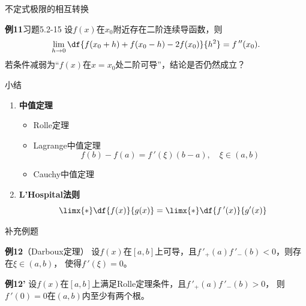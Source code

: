 \begin{frame}{不定式极限的相互转换}
	\linespread{1.2}
	\begin{center}
	\end{center}
\end{frame}

\begin{frame}
	\linespread{1.2}
	\begin{exampleblock}{{\bf 例11}\hfill 习题5.2-15}
		设$f(x)$在$x_0$附近存在二阶连续导函数，则
		$$\lim\limits_{h\to 0}\df{f(x_0+h)+f(x_0-h)-2f(x_0)}{h^2}=f\,''(x_0).$$
		若条件减弱为“$f(x)$在$x=x_0$处二阶可导”，结论是否仍然成立？
	\end{exampleblock}
\end{frame}

\begin{frame}[<+->]{小结}
	\linespread{1.5}
	\begin{enumerate}
	  \item {\bf 中值定理}
	  \begin{itemize}
	    \item Rolle定理
	    \item Lagrange中值定理
	    $$f(b)-f(a)=f\,'(\xi)(b-a),\quad \xi\in(a,b)$$
	    \item Cauchy中值定理
	  \end{itemize}
	  \item {\bf L'Hospital法则}
	  $$\limx{*}\df{f(x)}{g(x)}=\limx{*}\df{f\,'(x)}{g'(x)}$$
	\end{enumerate}
\end{frame}

\begin{frame}{补充例题}
	\linespread{1.2}
	\begin{exampleblock}{{\bf 例12}（Darboux定理）\hfill}
		设$f(x)$在$[a,b]$上可导，且$f\,'_+(a)f\,'_-(b)<0$，则存在$\xi\in(a,b)$，
		使得$f\,'(\xi)=0$。
	\end{exampleblock}
	\pause
	\bigskip
	\begin{exampleblock}{{\bf 例12'}\hfill}
		设$f(x)$在$[a,b]$上满足Rolle定理条件，且$f\,'_+(a)f\,'_-(b)>0$，
		则$f\,'(0)=0$在$(a,b)$内至少有两个根。
	\end{exampleblock}
\end{frame}

